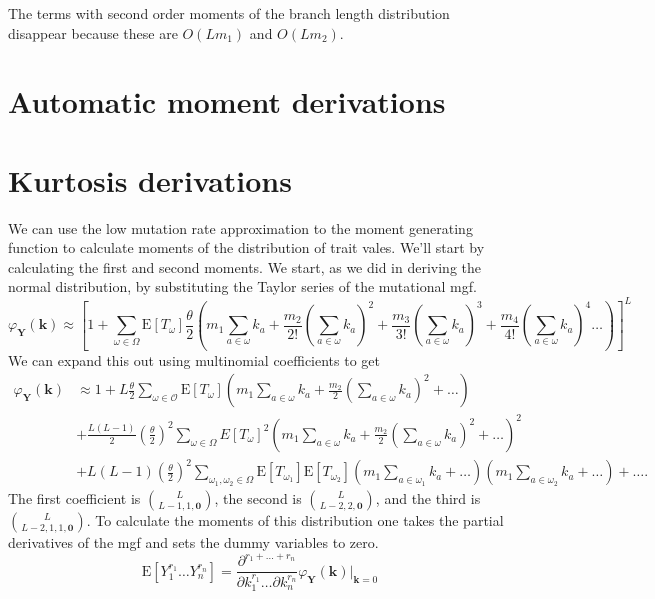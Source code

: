 \documentclass{article}
\newcommand{\T}{\frac{\theta}{2}}
\newcommand{\E}{\mathrm{E}}
\begin{document}
The terms with second order moments of the branch length distribution disappear
because these are $O(Lm_1)$ and $O(Lm_2)$. 
\section{Automatic moment derivations}
\label{symmath}
\section{Kurtosis derivations}
\label{kurt}
We can use the low mutation rate approximation to the moment generating function
to calculate moments of the distribution of trait vales. We'll start by
calculating the first and second moments. We start, as we did in deriving the
normal distribution, by substituting the Taylor series of the mutational mgf.
\begin{equation}
  \label{eq:mgf_approx_sub}
  \varphi_{\mathbf{Y}}(\mathbf{k}) \approx \left[ 1 + \sum_{\omega \in \Omega}
    \E[T_\omega] \T \left( m_1 \sum_{a \in \omega} k_a +
    \frac{m_2}{2!}\left( \sum_{a \in \omega} k_a\right)^2 +
    \frac{m_3}{3!}\left( \sum_{a \in \omega} k_a\right)^3 +
    \frac{m_4}{4!}\left( \sum_{a \in \omega} k_a\right)^4 \ldots \right) \right]^L
\end{equation}
We can expand this out using multinomial coefficients to get
\begin{align}
  \label{eq:mgf_approx_expand}
  \varphi_{\mathbf{Y}}(\mathbf{k}) &\approx 1 +
  L\T \sum_{\omega \in \mathcal{O}} \E[T_{\omega}]\left( m_1 \sum_{a \in \omega} k_a +
  \frac{m_2}{2}\left( \sum_{a \in \omega} k_a\right)^2 + \ldots \right) \nonumber \\
  &+ \frac{L(L-1)}{2} \left(\T\right)^2 \sum_{\omega \in \Omega} E[T_{\omega}]^2
  \left( m_1 \sum_{a \in \omega} k_a +
  \frac{m_2}{2}\left( \sum_{a \in \omega} k_a\right)^2 + \ldots \right)^2 \nonumber \\
  &+ L(L-1)\left(\T\right)^2\sum_{\omega_1, \omega_2 \in \Omega}\E[T_{\omega_1}]\E[T_{\omega_2}]
  \left( m_1 \sum_{a \in \omega_1} k_a + \ldots \right)
  \left( m_1 \sum_{a \in \omega_2} k_a + \ldots \right) + \ldots.
\end{align}
The first coefficient is $\binom{L}{L-1,1,\mathbf{0}}$, the second is
$\binom{L}{L-2,2,\mathbf{0}}$, and the third is $\binom{L}{L-2,1,1,\mathbf{0}}$.
To calculate the moments of this distribution one takes the partial derivatives
of the mgf and sets the dummy variables to zero.
\begin{equation}
  \label{eq:deriv}
  \E[Y_1^{r_1}\ldots Y_n^{r_n}] = \frac{\partial^{r_1 + \ldots + r_n}}{\partial k_1^{r_1} \ldots \partial k_n^{r_n}}
  \varphi_{\mathbf{Y}}(\mathbf{k})\Bigr|_{\mathbf{k}=0}
\end{equation}
\end{document}
